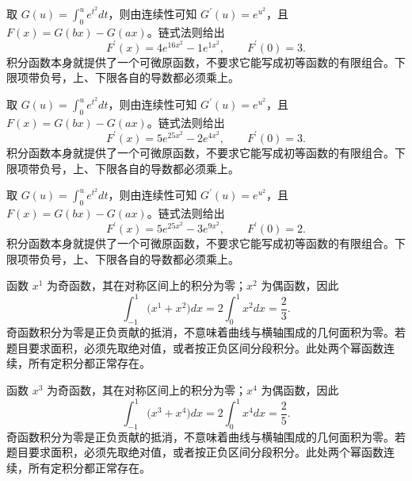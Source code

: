 \documentclass[UTF8,12pt,a4paper,fontset=fandol]{ctexart}
\begin{document}
\begin{solve}\label{ans:c17q12}
取 $G(u)=\int_0^u e^{t^2}dt$，则由连续性可知 $G^{\prime}(u)=e^{u^2}$，且 $F(x)=G(bx)-G(ax)$。链式法则给出
\[
F^{\prime}(x)=4e^{16x^2}-1e^{1x^2},\qquad F^{\prime}(0)=3.
\]
积分函数本身就提供了一个可微原函数，不要求它能写成初等函数的有限组合。下限项带负号，上、下限各自的导数都必须乘上。
\end{solve}

\begin{solve}\label{ans:c17q13}
取 $G(u)=\int_0^u e^{t^2}dt$，则由连续性可知 $G^{\prime}(u)=e^{u^2}$，且 $F(x)=G(bx)-G(ax)$。链式法则给出
\[
F^{\prime}(x)=5e^{25x^2}-2e^{4x^2},\qquad F^{\prime}(0)=3.
\]
积分函数本身就提供了一个可微原函数，不要求它能写成初等函数的有限组合。下限项带负号，上、下限各自的导数都必须乘上。
\end{solve}

\begin{solve}\label{ans:c17q14}
取 $G(u)=\int_0^u e^{t^2}dt$，则由连续性可知 $G^{\prime}(u)=e^{u^2}$，且 $F(x)=G(bx)-G(ax)$。链式法则给出
\[
F^{\prime}(x)=5e^{25x^2}-3e^{9x^2},\qquad F^{\prime}(0)=2.
\]
积分函数本身就提供了一个可微原函数，不要求它能写成初等函数的有限组合。下限项带负号，上、下限各自的导数都必须乘上。
\end{solve}

\begin{solve}\label{ans:c17q15}
函数 $x^{1}$ 为奇函数，其在对称区间上的积分为零；$x^{2}$ 为偶函数，因此
\[
\int_{-1}^1\bigl(x^{1}+x^{2}\bigr)dx=2\int_0^1x^{2}dx=\frac{2}{3}.
\]
奇函数积分为零是正负贡献的抵消，不意味着曲线与横轴围成的几何面积为零。若题目要求面积，必须先取绝对值，或者按正负区间分段积分。此处两个幂函数连续，所有定积分都正常存在。
\end{solve}

\begin{solve}\label{ans:c17q16}
函数 $x^{3}$ 为奇函数，其在对称区间上的积分为零；$x^{4}$ 为偶函数，因此
\[
\int_{-1}^1\bigl(x^{3}+x^{4}\bigr)dx=2\int_0^1x^{4}dx=\frac{2}{5}.
\]
奇函数积分为零是正负贡献的抵消，不意味着曲线与横轴围成的几何面积为零。若题目要求面积，必须先取绝对值，或者按正负区间分段积分。此处两个幂函数连续，所有定积分都正常存在。
\end{solve}
\end{document}
